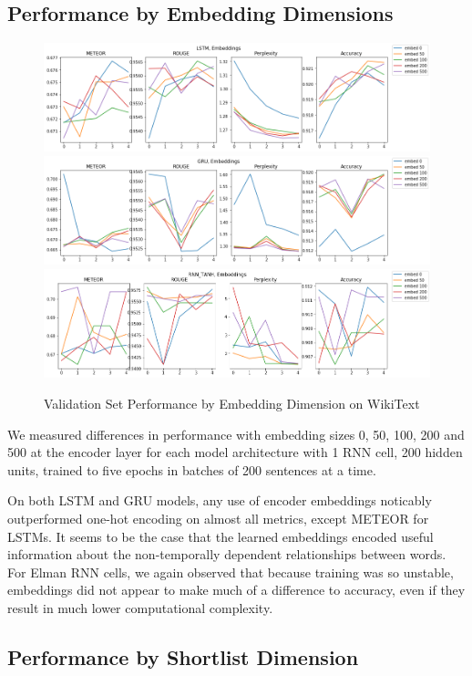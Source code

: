 \documentclass[a4paper]{article}
\begin{document}
\subsection{Performance by Embedding Dimensions}
\label{sec:perf_by_embedding}

\begin{figure}[!ht]
\includegraphics[width=0.8\columnwidth]{sr-perf-by-embedding-lstm}
\includegraphics[width=0.8\columnwidth]{sr-perf-by-embedding-gru}
\includegraphics[width=0.8\columnwidth]{sr-perf-by-embedding-rnn}
\centering
\caption{Validation Set Performance by Embedding Dimension on WikiText}
\end{figure}

We measured differences in performance with embedding sizes 0, 50,
100, 200 and 500 at the encoder layer for each model architecture with
1 RNN cell, 200 hidden units, trained to five epochs in batches of 200
sentences at a time.

On both LSTM and GRU models, any use of encoder embeddings noticably outperformed
one-hot encoding on almost all metrics, except METEOR for LSTMs. It seems to be
the case that the learned embeddings encoded useful information about the
non-temporally dependent relationships between words. For Elman RNN cells, we
again observed that because training was so unstable, embeddings did not
appear to make much of a difference to accuracy, even if they result in
much lower computational complexity.

\subsection{Performance by Shortlist Dimension}
\label{sec:perf_by_shortlist}
\end{document}
